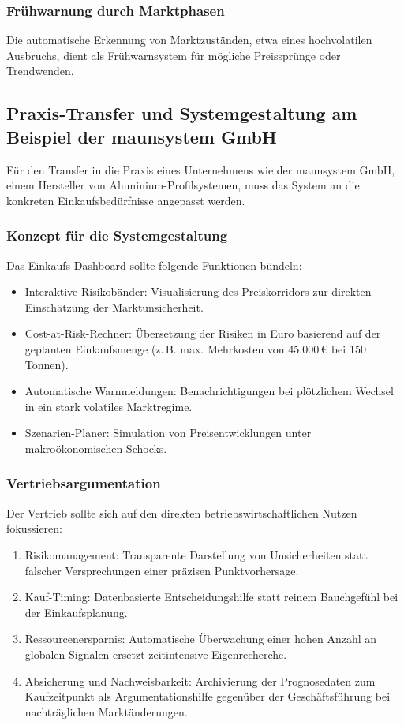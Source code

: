 \subsubsection{Frühwarnung durch Marktphasen}
Die automatische Erkennung von Marktzuständen, etwa eines hochvolatilen Ausbruchs, dient als Frühwarnsystem für mögliche Preissprünge oder Trendwenden.

\subsection{Praxis-Transfer und Systemgestaltung am Beispiel der maunsystem GmbH}
Für den Transfer in die Praxis eines Unternehmens wie der maunsystem GmbH, einem Hersteller von Aluminium-Profilsystemen, muss das System an die konkreten Einkaufsbedürfnisse angepasst werden.

\subsubsection{Konzept für die Systemgestaltung}
Das Einkaufs-Dashboard sollte folgende Funktionen bündeln:  
\begin{itemize}
    \item Interaktive Risikobänder: Visualisierung des Preiskorridors zur direkten Einschätzung der Marktunsicherheit.
    \item Cost-at-Risk-Rechner: Übersetzung der Risiken in Euro basierend auf der geplanten Einkaufsmenge (z.\,B. max. Mehrkosten von 45.000\,\euro{} bei 150 Tonnen).
    \item Automatische Warnmeldungen: Benachrichtigungen bei plötzlichem Wechsel in ein stark volatiles Marktregime.
    \item Szenarien-Planer: Simulation von Preisentwicklungen unter makroökonomischen Schocks.
\end{itemize}

\subsubsection{Vertriebsargumentation}
Der Vertrieb sollte sich auf den direkten betriebswirtschaftlichen Nutzen fokussieren:
\begin{enumerate}
    \item Risikomanagement: Transparente Darstellung von Unsicherheiten statt falscher Versprechungen einer präzisen Punktvorhersage.
    \item Kauf-Timing: Datenbasierte Entscheidungshilfe statt reinem Bauchgefühl bei der Einkaufsplanung.
    \item Ressourcenersparnis: Automatische Überwachung einer hohen Anzahl an globalen Signalen ersetzt zeitintensive Eigenrecherche.
    \item Absicherung und Nachweisbarkeit: Archivierung der Prognosedaten zum Kaufzeitpunkt als Argumentationshilfe gegenüber der Geschäftsführung bei nachträglichen Marktänderungen.
\end{enumerate}


